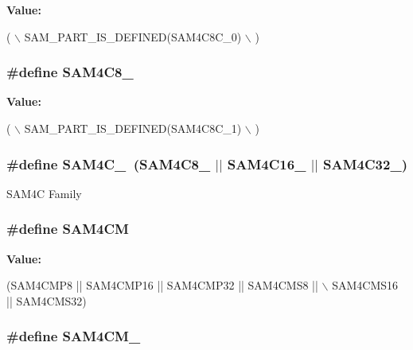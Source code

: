 {\bfseries Value\-:}
\begin{DoxyCode}
( \(\backslash\)
                SAM\_PART\_IS\_DEFINED(SAM4C8C\_0) \(\backslash\)
                )
\end{DoxyCode}
\hypertarget{group__sam__part__macros__group_ga349700d2ac7573d426776e85f7632361}{
\subsubsection[{S\-A\-M4\-C8\-\_\-1}]{\setlength{\rightskip}{0pt plus 5cm}\#define S\-A\-M4\-C8\-\_}}\label{group__sam__part__macros__group_ga349700d2ac7573d426776e85f7632361}
{\bfseries Value\-:}
\begin{DoxyCode}
( \(\backslash\)
                SAM\_PART\_IS\_DEFINED(SAM4C8C\_1) \(\backslash\)
                )
\end{DoxyCode}
\hypertarget{group__sam__part__macros__group_ga5033d451b0d964e7a95f7b70a33dec8b}{
\subsubsection[{S\-A\-M4\-C\-\_\-0}]{\setlength{\rightskip}{0pt plus 5cm}\#define S\-A\-M4\-C\-\_~(S\-A\-M4\-C8\-\_ $|$$|$ S\-A\-M4\-C16\-\_ $|$$|$ S\-A\-M4\-C32\-\_)}}\label{group__sam__part__macros__group_ga5033d451b0d964e7a95f7b70a33dec8b}
S\-A\-M4\-C Family \hypertarget{group__sam__part__macros__group_ga067569f8932adc3c2b869ead8c68f7de}{
\subsubsection[{S\-A\-M4\-C\-M}]{\setlength{\rightskip}{0pt plus 5cm}\#define S\-A\-M4\-C\-M}}\label{group__sam__part__macros__group_ga067569f8932adc3c2b869ead8c68f7de}
{\bfseries Value\-:}
\begin{DoxyCode}
(SAM4CMP8 || SAM4CMP16 || SAM4CMP32 || SAM4CMS8 || \(\backslash\)
                        SAM4CMS16 || SAM4CMS32)
\end{DoxyCode}
\hypertarget{group__sam__part__macros__group_gadbca33c488233ea066312c7c93b62965}{
\subsubsection[{S\-A\-M4\-C\-M\-\_\-0}]{\setlength{\rightskip}{0pt plus 5cm}\#define S\-A\-M4\-C\-M\-\_}}\label{group__sam__part__macros__group_gadbca33c488233ea066312c7c93b62965}
